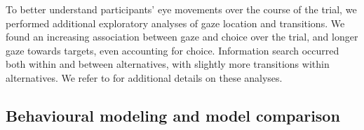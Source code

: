 \documentclass[11pt, a4paper]{article}
\begin{document}
To better understand participants' eye movements over the course of the trial, we performed additional exploratory analyses of gaze location and transitions. We found an increasing association between gaze and choice over the trial, and longer gaze towards targets, even accounting for choice. Information search occurred both within and between alternatives, with slightly more transitions within alternatives. We refer to  for additional details on these analyses.

\subsection*{Behavioural modeling and model comparison}

\end{document}
